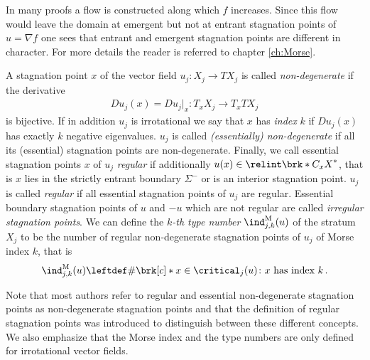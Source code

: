 In many proofs a flow is constructed along which $f$ increases.
Since this flow would leave the domain at emergent but not at entrant stagnation points of $u=\nabla f$ one sees that entrant and emergent stagnation points are different in character.
For more details the reader is referred to chapter \ref{ch:Morse}.
\begin{definition}\label{df:nonDegeneracy}
  A stagnation point $x$ of the vector field $u_j\colon X_j\to TX_j$ is called
  \emph{non-degenerate} if the derivative 
  \begin{align*}
    Du_j(x)=Du_j\big\vert_x\colon T_xX_j\to T_xTX_j
  \end{align*}
  is bijective.
  If in addition $u_j$ is irrotational we say that $x$ has \emph{index} $k$
  if $Du_j(x)$ has exactly $k$ negative eigenvalues.
  $u_j$ is called \emph{(essentially) non-degenerate} if all its (essential) stagnation points
  are non-degenerate.
  Finally, we call essential stagnation points $x$ of $u_j$ \emph{regular} if additionally $u(x)\in\relint \brk*{C_xX}^*$,
  that is $x$ lies in the strictly entrant boundary $\Sigma^-$ or is an interior stagnation point.
  $u_j$ is called \emph{regular} if all essential stagnation points of $u_j$ are regular.
  Essential boundary stagnation points of $u$ and $-u$ which are not regular are called \emph{irregular stagnation points}.
  We can define the \emph{$k$-th type number} $\ind^\text{M}_{j,k}(u)$ of the
  stratum $X_j$ to be the number of regular non-degenerate stagnation points of $u_j$ of Morse index $k$,
  that is
  \begin{align}
    \ind^\text{M}_{j,k}(u)\leftdef\#\brk[c]*{x\in\critical_j(u)\colon x\text{ has index }k}\,.\label{eq:def_typenbr_strata}
  \end{align}
\end{definition}
Note that most authors refer to regular and essential non-degenerate stagnation points as non-degenerate stagnation points
and that the definition of regular stagnation points was introduced to distinguish between these different concepts.
We also emphasize that the Morse index and the type numbers are only defined for irrotational vector fields.
